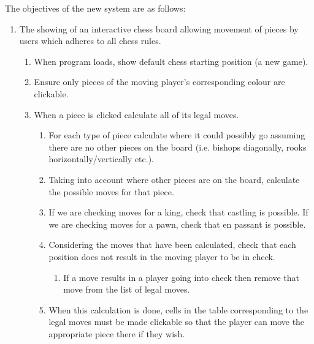 \documentclass[twoside, 12pt]{report}
\begin{document}
The objectives of the new system are as follows:
\begin{enumerate}
	\item The showing of an interactive chess board allowing movement of pieces by users which adheres to all chess rules.
	\begin{enumerate}
		\item When program loads, show default chess starting position (a new game).
		\item Ensure only pieces of the moving player's corresponding colour are clickable.
		\item When a piece is clicked calculate all of its legal moves.
		\begin{enumerate}
			\item For each type of piece calculate where it could possibly go assuming there are no other pieces on the board (i.e. bishops diagonally, rooks horizontally/vertically etc.).
			\item Taking into account where other pieces are on the board, calculate the possible moves for that piece.
			\item If we are checking moves for a king, check that castling is possible. If we are checking moves for a pawn, check that en passant is possible.
			\item Considering the moves that have been calculated, check that each position does not result in the moving player to be in check. 
			\begin{enumerate}
				\item If a move results in a player going into check then remove that move from the list of legal moves.
			\end{enumerate}
			\item When this calculation is done, cells in the table corresponding to the legal moves must be made clickable so that the player can move the appropriate piece there if they wish.
			

\end{enumerate}
\end{enumerate}
\end{enumerate}
\end{document}
